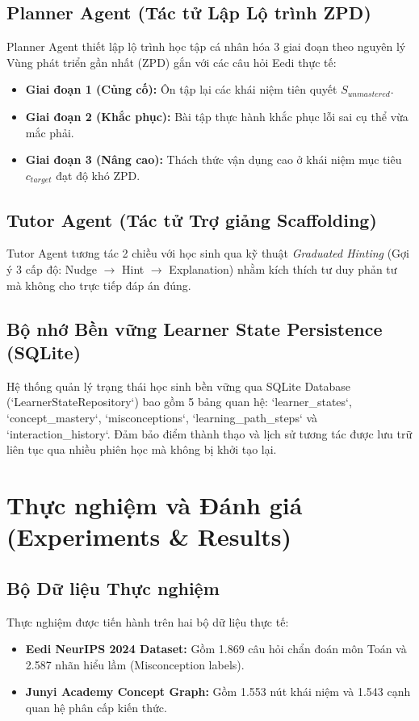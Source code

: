 \documentclass[conference]{IEEEtran}
\begin{document}
\subsection{Planner Agent (Tác tử Lập Lộ trình ZPD)}
Planner Agent thiết lập lộ trình học tập cá nhân hóa 3 giai đoạn theo nguyên lý Vùng phát triển gần nhất (ZPD) gắn với các câu hỏi Eedi thực tế:
\begin{itemize}
    \item \textbf{Giai đoạn 1 (Củng cố):} Ôn tập lại các khái niệm tiên quyết $S_{unmastered}$.
    \item \textbf{Giai đoạn 2 (Khắc phục):} Bài tập thực hành khắc phục lỗi sai cụ thể vừa mắc phải.
    \item \textbf{Giai đoạn 3 (Nâng cao):} Thách thức vận dụng cao ở khái niệm mục tiêu $c_{target}$ đạt độ khó ZPD.
\end{itemize}

\subsection{Tutor Agent (Tác tử Trợ giảng Scaffolding)}
Tutor Agent tương tác 2 chiều với học sinh qua kỹ thuật \textit{Graduated Hinting} (Gợi ý 3 cấp độ: Nudge $\rightarrow$ Hint $\rightarrow$ Explanation) nhằm kích thích tư duy phản tư mà không cho trực tiếp đáp án đúng.

\subsection{Bộ nhớ Bền vững Learner State Persistence (SQLite)}
Hệ thống quản lý trạng thái học sinh bền vững qua SQLite Database (`LearnerStateRepository`) bao gồm 5 bảng quan hệ: `learner_states`, `concept_mastery`, `misconceptions`, `learning_path_steps` và `interaction_history`. Đảm bảo điểm thành thạo và lịch sử tương tác được lưu trữ liên tục qua nhiều phiên học mà không bị khởi tạo lại.

\section{Thực nghiệm và Đánh giá (Experiments \& Results)}

\subsection{Bộ Dữ liệu Thực nghiệm}
Thực nghiệm được tiến hành trên hai bộ dữ liệu thực tế:
\begin{itemize}
    \item \textbf{Eedi NeurIPS 2024 Dataset:} Gồm 1.869 câu hỏi chẩn đoán môn Toán và 2.587 nhãn hiểu lầm (Misconception labels).
    \item \textbf{Junyi Academy Concept Graph:} Gồm 1.553 nút khái niệm và 1.543 cạnh quan hệ phân cấp kiến thức.
\end{itemize}
\end{document}
